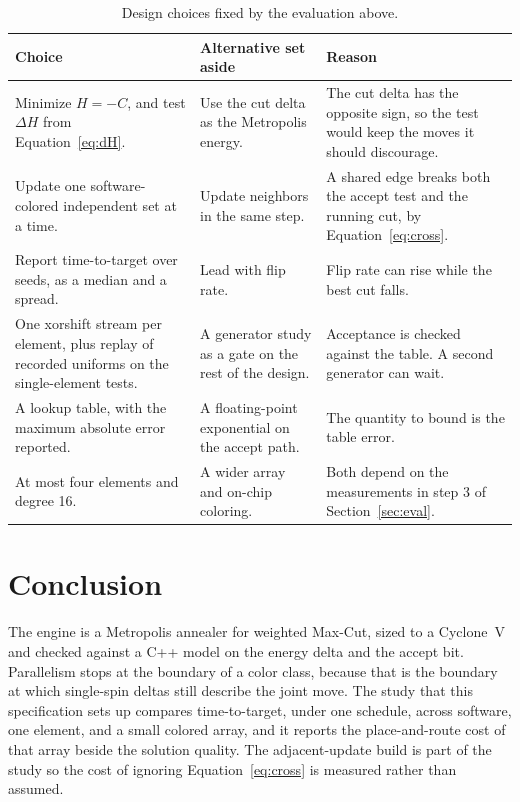 \documentclass[10pt,twocolumn]{article}
\begin{document}
\begin{table}[t]
\caption{Design choices fixed by the evaluation above.}
\label{tab:choices}
\centering
\small
\begin{tabular}{@{}>{\raggedright\arraybackslash}p{}>{\raggedright\arraybackslash}p{}>{\raggedright\arraybackslash}p{}@{}}
\toprule
Choice & Alternative set aside & Reason \\
\midrule
Minimize \(H=-C\), and test \(\Delta H\) from Equation~\eqref{eq:dH}. &
Use the cut delta as the Metropolis energy. &
The cut delta has the opposite sign, so the test would keep the moves it should discourage. \\
Update one software-colored independent set at a time. &
Update neighbors in the same step. &
A shared edge breaks both the accept test and the running cut, by Equation~\eqref{eq:cross}. \\
Report time-to-target over seeds, as a median and a spread. &
Lead with flip rate. &
Flip rate can rise while the best cut falls. \\
One xorshift stream per element, plus replay of recorded uniforms on the single-element tests. &
A generator study as a gate on the rest of the design. &
Acceptance is checked against the table. A second generator can wait. \\
A lookup table, with the maximum absolute error reported. &
A floating-point exponential on the accept path. &
The quantity to bound is the table error. \\
At most four elements and degree 16. &
A wider array and on-chip coloring. &
Both depend on the measurements in step 3 of Section~\ref{sec:eval}. \\
\bottomrule
\end{tabular}
\end{table}

\section{Conclusion}

The engine is a Metropolis annealer for weighted Max-Cut, sized to a Cyclone~V and checked against a C++ model on the energy delta and the accept bit.
Parallelism stops at the boundary of a color class, because that is the boundary at which single-spin deltas still describe the joint move.
The study that this specification sets up compares time-to-target, under one schedule, across software, one element, and a small colored array, and it reports the place-and-route cost of that array beside the solution quality.
The adjacent-update build is part of the study so the cost of ignoring Equation~\eqref{eq:cross} is measured rather than assumed.



\end{document}
